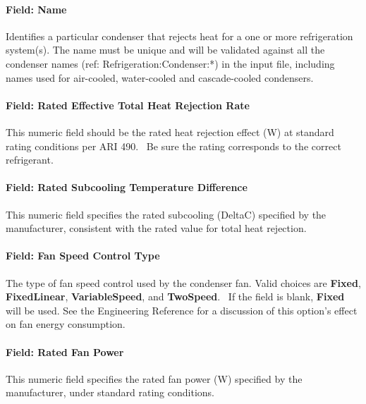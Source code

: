 \paragraph{Field: Name}\label{field-name-10-013}

Identifies a particular condenser that rejects heat for a one or more refrigeration system(s). The name must be unique and will be validated against all the condenser names (ref: Refrigeration:Condenser:*) in the input file, including names used for air-cooled, water-cooled and cascade-cooled condensers.

\paragraph{Field: Rated Effective Total Heat Rejection Rate}\label{field-rated-effective-total-heat-rejection-rate}

This numeric field should be the rated heat rejection effect (W) at standard rating conditions per ARI 490.~ Be sure the rating corresponds to the correct refrigerant.

\paragraph{Field: Rated Subcooling Temperature Difference}\label{field-rated-subcooling-temperature-difference-1}

This numeric field specifies the rated subcooling (DeltaC) specified by the manufacturer, consistent with the rated value for total heat rejection.

\paragraph{Field: Fan Speed Control Type}\label{field-fan-speed-control-type}

The type of fan speed control used by the condenser fan. Valid choices are \textbf{Fixed}, \textbf{FixedLinear}, \textbf{VariableSpeed}, and \textbf{TwoSpeed}.~ If the field is blank, \textbf{Fixed} will be used. See the Engineering Reference for a discussion of this option's effect on fan energy consumption.

\paragraph{Field: Rated Fan Power}\label{field-rated-fan-power-1-000}

This numeric field specifies the rated fan power (W) specified by the manufacturer, under standard rating conditions.

